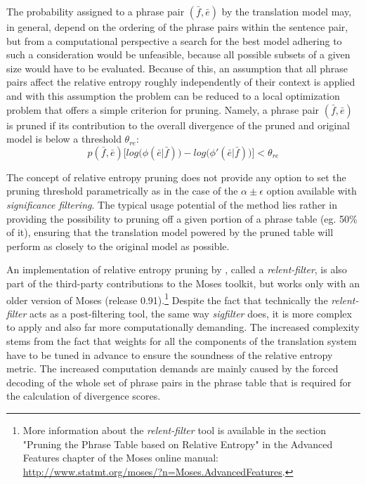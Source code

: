 The probability assigned to a phrase pair $(\bar{f},\bar{e})$ by the translation model
may, in general, depend on the ordering of the phrase pairs within the sentence pair, but from
a computational perspective a search for the best model adhering to such a consideration
would be unfeasible, because all possible subsets of a given size would have to be evaluated.
Because of this, an assumption that all phrase pairs affect the relative entropy roughly
independently of their context is applied and with this assumption the problem can be
reduced to a local optimization problem that offers a simple criterion for pruning.
Namely, a phrase pair $(\bar{f},\bar{e})$ is pruned if its contribution to the overall
divergence of the pruned and original model is below a threshold $\theta_{re}$:
\begin{equation}
  p(\bar{f},\bar{e}) \Big[log\big(\phi(\bar{e}|\bar{f})\big) - log\big(\phi'(\bar{e}|\bar{f})\big)\Big] < \theta_{re}
\end{equation}

The concept of relative entropy pruning does not provide any option to set
the pruning threshold parametrically as in the case of the $\alpha \pm \epsilon$ option
available with \emph{significance filtering}.
The typical usage potential of the method lies rather in providing the possibility to pruning off
a given portion of a phrase table (eg. 50\% of it), ensuring that the translation model
powered by the pruned table will perform as closely to the original model as possible.

An implementation of relative entropy pruning by \citet{ling:relentfilter}, called a
\emph{relent-filter}, is also part of the third-party contributions to the Moses toolkit,
but works only with an older version of Moses (release 0.91).\footnote{More information
about the \emph{relent-filter} tool is available in the section "Pruning the Phrase Table based
on Relative Entropy" in the Advanced Features chapter of the Moses online manual:
\url{http://www.statmt.org/moses/?n=Moses.AdvancedFeatures}.}
Despite the fact that technically the \emph{relent-filter} acts as a post-filtering tool,
the same way \emph{sigfilter} does, it is more complex to apply and also far more
computationally demanding.
The increased complexity stems from the fact that weights for all the components of the
translation system have to be tuned in advance to ensure the soundness of the relative entropy metric.
The increased computation demands are mainly caused by the forced decoding of the whole set of
phrase pairs in the phrase table that is required for the calculation of divergence scores.

